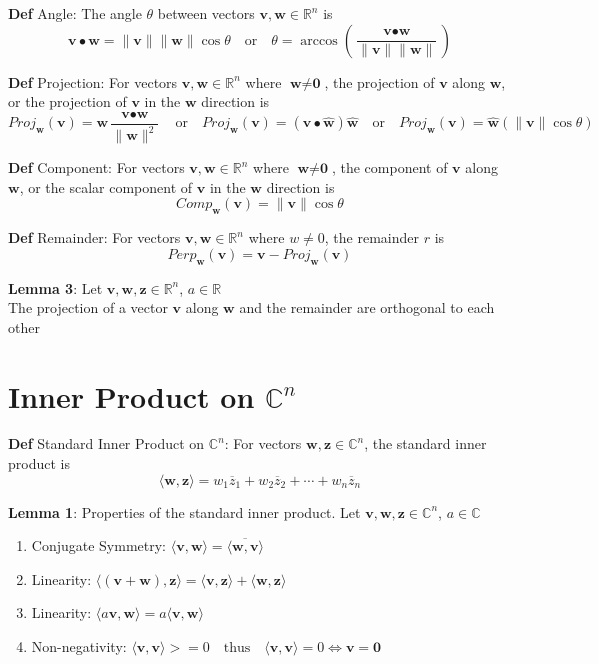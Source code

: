 \documentclass[11pt,notitlepage]{report}
\newcommand{\tbf}[1]{\textbf{#1}}
\begin{document}
\textbf{Def} Angle: The angle $\theta$ between vectors $\tbf v, \tbf w \in \mathbb R^n$ is $$\tbf v \bullet \tbf w = \lVert \tbf v \rVert \lVert \tbf w \rVert \cos{\theta} \quad \text{or} \quad \theta = \arccos\left(\frac{\tbf v \bullet \tbf w}{\lVert \tbf v \rVert \lVert \tbf w \rVert}\right)$$


\textbf{Def} Projection: For vectors $\tbf v, \tbf w \in \mathbb R^n$ where $\tbf w \ne \tbf 0$, the projection of $\tbf v$ along $\tbf w$, or the projection of $\tbf v$ in the $\tbf w$ direction is 
$$Proj_\tbf w(\tbf v) = \tbf w\frac{\tbf v \bullet \tbf w}{\lVert \tbf w \rVert^2} \quad \text{or} \quad Proj_\tbf w(\tbf v) = (\tbf v \bullet \hat{\tbf w}) \hat{\tbf w} \quad \text{or} \quad Proj_\tbf w(\tbf v) = \hat{\tbf w}(\lVert \tbf v \rVert \cos{\theta})$$


\textbf{Def} Component: For vectors $\tbf v, \tbf w \in \mathbb R^n$ where $\tbf w \ne \tbf 0$, the component of $\tbf v$ along $\tbf w$, or the scalar component of $\tbf v$ in the $\tbf w$ direction is 
$$Comp_\tbf w(\tbf v) =\lVert \tbf v \rVert \cos{\theta}$$


\textbf{Def} Remainder: For vectors $\tbf v, \tbf w \in \mathbb R^n$ where $w \ne 0$, the remainder $r$ is 
$$Perp_\tbf w(\tbf v) = \tbf v - Proj_\tbf w(\tbf v)$$


\textbf{Lemma 3}: Let $\tbf v, \tbf w, \tbf z \in \mathbb R^n$, $a \in \mathbb R$\\
\hspace*{5mm} The projection of a vector $\tbf v$ along $\tbf w$ and the remainder are orthogonal to each other

\newpage


\section{Inner Product on \texorpdfstring{$\mathbb C^n$}{Cn}}


\textbf{Def} Standard Inner Product on $\mathbb C^n$: For vectors $\tbf w, \tbf z \in \mathbb C^n$, the standard inner product is 
$$\langle \tbf w,\tbf z\rangle = w_1\overline{z}_1 + w_2\overline{z}_2 + \cdots + w_n\overline{z}_n$$


\textbf{Lemma 1}: Properties of the standard inner product. Let $\tbf v, \tbf w, \tbf z \in \mathbb C^n$, $a \in \mathbb C$
\begin{enumerate}[label=(\roman*)]
    \item Conjugate Symmetry: $\langle \tbf v,\tbf w\rangle = \overline{\langle \tbf w,\tbf v\rangle}$
    \item Linearity: $\langle (\tbf v + \tbf w),\tbf z\rangle = \langle \tbf v,\tbf z\rangle + \langle \tbf w,\tbf z\rangle$
    \item Linearity: $\langle a\tbf v,\tbf w\rangle = a\langle \tbf v,\tbf w\rangle$
    \item Non-negativity: $\langle \tbf v,\tbf v\rangle >= 0 \quad \text{thus} \quad \langle \tbf v,\tbf v\rangle = 0 \Longleftrightarrow \tbf v = \textbf{0}$
\end{enumerate}
\end{document}
